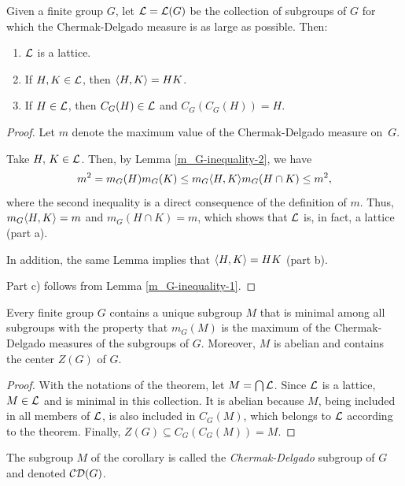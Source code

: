 \begin{thm}\label{stronger-chermak-delgado}
    Given a finite group\/ $G$, let\/ ${\cal L} = {\cal L}(G)$ be the collection of subgroups of\/ $G$ for which the Chermak-Delgado measure is as large as possible. Then:
    \begin{enumerate}[\upshape a)]
    \item $\cal L$ is a lattice.
    \item If\/ $H,K\in\cal L$, then $\langle H,K\rangle = HK$.
    \item If\/ $H\in\cal L$, then $C_G(H)\in\cal L$ and $C_G(C_G(H)) = H$.
    \end{enumerate}
\end{thm}

\begin{proof} Let $m$ denote the maximum value of the Chermak-Delgado measure on~$G$.

Take $H,\,K\in\cal L$. Then, by Lemma \ref{m_G-inequality-2}, we have
$$
    m^2 = m_G(H)m_G(K) \le m_G\langle H,K\rangle m_G(H\cap K) \le m^2,
$$
where the second inequality is a direct consequence of the definition of $m$. Thus, $m_G\langle H,K\rangle=m$ and $m_G(H\cap K)=m$, which shows that $\cal L$ is, in fact, a lattice (part a).

In addition, the same Lemma implies that $\langle H,K\rangle=HK$ (part b).

Part c) follows from Lemma \ref{m_G-inequality-1}.  \end{proof}

\begin{cor}\label{m_G-is-max}
   Every finite group\/ $G$ contains a unique subgroup\/ $M$ that is minimal among all subgroups with the property that\/ $m_G(M)$ is the maximum of the Chermak-Delgado measures of the subgroups of $G$. Moreover, $M$ is abelian and contains the center\/ $Z(G)$ of\/ $G$.
\end{cor}

\begin{proof}
    With the notations of the theorem, let $M=\bigcap\cal L$. Since $\cal L$ is a lattice, $M\in\cal L$ and is minimal in this collection. It is abelian because $M$, being included in all members of $\cal L$, is also included in $C_G(M)$, which belongs to $\cal L$ according to the theorem. Finally, $Z(G)\subseteq C_G(C_G(M))=M$.  
\end{proof}

\begin{defn}
    The subgroup\/ $M$ of the corollary is called the \textsl{Chermak-Delgado} subgroup of\/ $G$ and denoted\/ $\operatorname{{\cal CD}}(G)$.
\end{defn}

